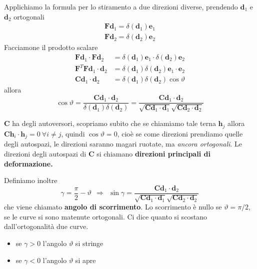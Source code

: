 \documentclass[10pt,a4paper,twoside]{book}
\begin{document}
Applichiamo la formula per lo stiramento a due direzioni diverse, prendendo $\mathbf{d}_{1}$ e $\mathbf{d}_{2}$ ortogonali
\begin{gather*}
\mathbf{Fd}_{1} =\delta (\mathbf{d}_{1})\mathbf{e}_{1}\\
\mathbf{Fd}_{2} =\delta (\mathbf{d}_{2})\mathbf{e}_{2}
\end{gather*}
Facciamone il prodotto scalare
\begin{equation*}
\begin{aligned}
\mathbf{Fd}_{1} \cdotp \mathbf{Fd}_{2} & =\delta (\mathbf{d}_{1})\mathbf{e}_{1} \cdotp \delta (\mathbf{d}_{2})\mathbf{e}_{2}\\
\mathbf{F}^{T}\mathbf{Fd}_{1} \cdotp \mathbf{d}_{2} & =\delta (\mathbf{d}_{1}) \delta (\mathbf{d}_{2})\mathbf{e}_{1} \cdotp \mathbf{e}_{2}\\
\mathbf{Cd}_{1} \cdotp \mathbf{d}_{2} & =\delta (\mathbf{d}_{1}) \delta (\mathbf{d}_{2})\cos \vartheta 
\end{aligned}
\end{equation*}
allora
\begin{equation*}
\boxed{\cos \vartheta =\frac{\mathbf{Cd}_{1} \cdotp \mathbf{d}_{2}}{\delta (\mathbf{d}_{1}) \delta (\mathbf{d}_{2})} =\frac{\mathbf{Cd}_{1} \cdotp \mathbf{d}_{2}}{\sqrt{\mathbf{Cd}_{1} \cdotp \mathbf{d}_{1}}\sqrt{\mathbf{Cd}_{2} \cdotp \mathbf{d}_{2}}}}
\end{equation*}
\begin{oss}
$\mathbf{C}$ ha degli autoversori, scopriamo subito che se chiamiamo tale terna $\mathbf{h}_{j}$ allora $\mathbf{Ch}_{i} \cdotp \mathbf{h}_{j} =0\ \forall i\neq j$, quindi $\cos \vartheta =0$, cioè se come direzioni prendiamo quelle degli autospazi, le direzioni saranno magari ruotate, ma \textit{ancora ortogonali}. Le direzioni degli autospazi di $\mathbf{C}$ si chiamano \textbf{direzioni principali di deformazione.}
\end{oss}
Definiamo inoltre
\begin{equation*}
\boxed{\gamma =\frac{\pi }{2} -\vartheta } \ \ \Rightarrow \ \ \sin \gamma =\frac{\mathbf{Cd}_{1} \cdotp \mathbf{d}_{2}}{\sqrt{\mathbf{Cd}_{1} \cdotp \mathbf{d}_{1}}\sqrt{\mathbf{Cd}_{2} \cdotp \mathbf{d}_{2}}}
\end{equation*}
che viene chiamato \textbf{angolo di scorrimento}. Lo scorrimento è nullo se $\vartheta =\pi /2$, se le curve si sono matenute ortogonali. Ci dice quanto si scostano dall'ortogonalità due curve.
\begin{itemize}
\item se $\gamma  >0$ l'angolo $\vartheta $ si stringe
\item se $\gamma < 0$ l'angolo $\vartheta $ si apre
\end{itemize}
\end{document}
